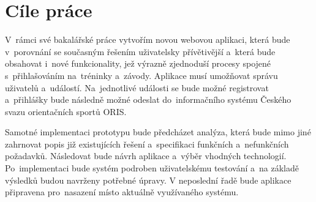 \section{Cíle práce}
V~rámci své bakalářské práce vytvořím novou webovou aplikaci, která bude v~porovnání se současným řešením uživatelsky přívětivější a~která bude obsahovat i~nové funkcionality, jež výrazně zjednoduší procesy spojené s~přihlašováním na~tréninky a~závody. Aplikace musí umožňovat správu uživatelů a~událostí. Na~jednotlivé události se bude možné registrovat a~přihlášky bude následně možné odeslat do~informačního systému Českého svazu orientačních sportů ORIS.

Samotné implementaci prototypu bude předcházet analýza, která bude mimo jiné zahrnovat popis již existujících řešení a~specifikaci funkčních a~nefunkčních požadavků. Následovat bude návrh aplikace a~výběr vhodných technologií. Po~implementaci bude systém podroben uživatelskému testování a~na základě výsledků budou navrženy potřebné úpravy. V neposlední řadě bude aplikace připravena pro~nasazení místo aktuálně využívaného systému.
